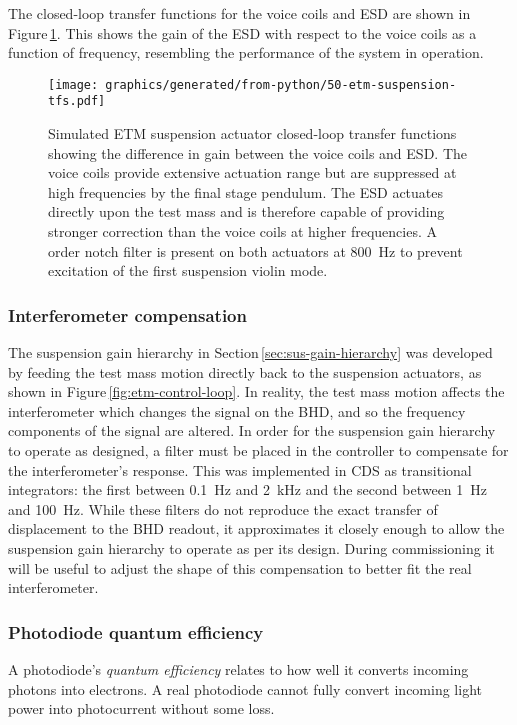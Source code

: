 The closed-loop transfer functions for the voice coils and \gls{ESD} are shown in Figure\,\ref{fig:suspension-crossover}. This shows the gain of the \gls{ESD} with respect to the voice coils as a function of frequency, resembling the performance of the system in operation.

\begin{figure}
  \texttt{[image: graphics/generated/from-python/50-etm-suspension-tfs.pdf]}
  \caption[Simulated end test mass suspension actuator closed loop transfer functions]{\label{fig:suspension-crossover}Simulated \SSMEXPT{} ETM suspension actuator closed-loop transfer functions showing the difference in gain between the voice coils and \gls{ESD}. The voice coils provide extensive actuation range but are suppressed at high frequencies by the final stage pendulum. The \gls{ESD} actuates directly upon the test mass and is therefore capable of providing stronger correction than the voice coils at higher frequencies. A  order notch filter is present on both actuators at \SI{800}{\hertz} to prevent excitation of the first suspension violin mode.}
\end{figure}

\subsubsection{\label{sec:ifo-compensation}Interferometer compensation}
The suspension gain hierarchy in Section\,\ref{sec:sus-gain-hierarchy} was developed by feeding the test mass motion directly back to the suspension actuators, as shown in Figure\,\ref{fig:etm-control-loop}. In reality, the test mass motion affects the interferometer which changes the signal on the \gls{BHD}, and so the frequency components of the signal are altered. In order for the suspension gain hierarchy to operate as designed, a filter must be placed in the controller to compensate for the interferometer's response. This was implemented in \gls{CDS} as transitional integrators: the first between \SI{0.1}{\hertz} and \SI{2}{\kilo\hertz} and the second between \SI{1}{\hertz} and \SI{100}{\hertz}. While these filters do not reproduce the exact transfer of \LMINUS{} displacement to the \gls{BHD} readout, it approximates it closely enough to allow the suspension gain hierarchy to operate as per its design. During commissioning it will be useful to adjust the shape of this compensation to better fit the real interferometer.

\subsubsection{Photodiode quantum efficiency}
A photodiode's \emph{quantum efficiency} relates to how well it converts incoming photons into electrons. A real photodiode cannot fully convert incoming light power into photocurrent without some loss.

